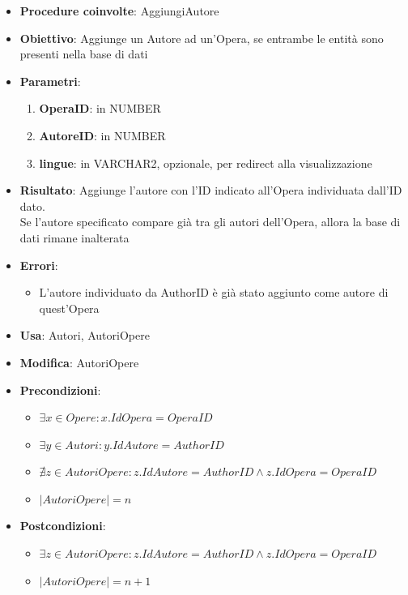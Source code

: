 \label{AggiuntaAutore}
\begin{itemize}
	\item \textbf{Procedure coinvolte}: AggiungiAutore
	\item \textbf{Obiettivo}: Aggiunge un Autore ad un'Opera, se entrambe le entità sono presenti nella base di dati
	\item \textbf{Parametri}:
	\begin{enumerate}
		\item \textbf{OperaID}: in NUMBER
		\item \textbf{AutoreID}: in NUMBER
		\item \textbf{lingue}: in VARCHAR2, opzionale, per redirect alla visualizzazione
	\end{enumerate}
	\item \textbf{Risultato}: Aggiunge l'autore con l'ID indicato all'Opera individuata dall'ID dato.\\
	Se l'autore specificato compare già tra gli autori dell'Opera, allora la base di dati rimane inalterata
	\item \textbf{Errori}: 
	\begin{itemize}
		\item L'autore individuato da AuthorID è già stato aggiunto come autore di quest'Opera
	\end{itemize}
	\item \textbf{Usa}: Autori, AutoriOpere
	\item \textbf{Modifica}: AutoriOpere
	\item \textbf{Precondizioni}:
	\begin{itemize}
		\item $\exists x \in Opere : x.IdOpera = OperaID$
		\item $\exists y \in Autori : y.IdAutore = AuthorID$
		\item $\nexists z \in AutoriOpere : z.IdAutore = AuthorID \land z.IdOpera = OperaID$
		\item $|AutoriOpere| = n$
	\end{itemize}
	\item \textbf{Postcondizioni}:
	\begin{itemize}
		\item $\exists z \in AutoriOpere : z.IdAutore = AuthorID \land z.IdOpera = OperaID$
		\item $|AutoriOpere| = n + 1$
	\end{itemize}
\end{itemize}


